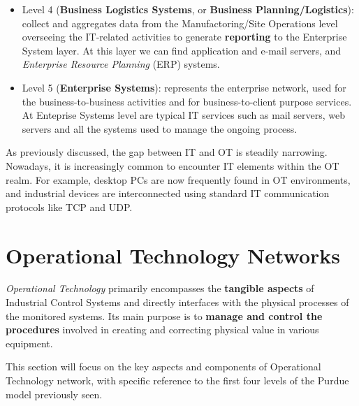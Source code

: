 \begin{itemize}
	\item Level 4 (\textbf{Business Logistics Systems}, or \textbf{Business Planning/Logistics}): collect and aggregates data from the Manufactoring/Site Operations level overseeing the IT-related activities to generate \textbf{reporting} to the Enterprise System layer. At this layer we can find application and e-mail servers, and \textit{Enterprise Resource Planning} (ERP) systems.
	
	\item Level 5 (\textbf{Enterprise Systems}): represents the enterprise network, used for the business-to-business activities and for business-to-client purpose services. At Enteprise Systems level are typical IT services such as mail servers, web servers and all the systems used to manage the ongoing process.
\end{itemize}

As previously discussed, the gap between IT and OT is steadily narrowing. Nowadays, it is increasingly common to encounter IT elements within the OT realm. For example, desktop PCs are now frequently found in OT environments, and industrial devices are interconnected using standard IT communication protocols like TCP and UDP.

\section{Operational Technology Networks}
\label{subsec:2_ot_network}

\textit{Operational Technology} primarily encompasses the \textbf{tangible aspects} of Industrial Control Systems and directly interfaces with the physical processes of the monitored systems. Its main purpose is to \textbf{manage and control the procedures} involved in creating and correcting physical value in various equipment.

This section will focus on the key aspects and components of Operational Technology network, with specific reference to the first four levels of the Purdue model previously seen.



